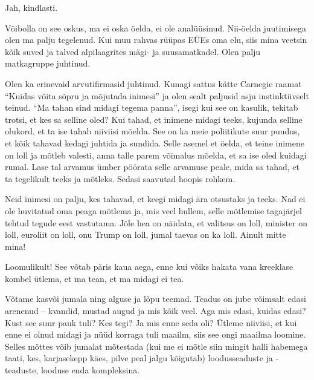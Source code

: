 
Jah, kindlasti.


Võibolla on see oskus, ma ei oska öelda, ei ole analüüsinud. 
Nii-öelda juutimisega olen ma palju tegelenud. Kui muu rahvas rüüpas EÜEs 
oma elu, siis mina veetsin kõik suved ja talved alpilaagrites mägi- ja suusamatkadel. Olen palju matkagruppe juhtinud.

Olen ka erinevaid arvutifirmasid 
juhtinud. Kunagi sattus kätte Carnegie raamat \enquote{Kuidas võita 
sõpru ja mõjutada inimesi} ja olen sealt paljusid asju 
instinktiivselt teinud. \enquote{Ma tahan sind midagi 
tegema panna}, isegi kui see on kasulik, tekitab trotsi, et kes 
sa selline oled? Kui tahad, et inimene midagi teeks, kujunda selline 
olukord, et ta ise tahab niiviisi mõelda. See on ka meie poliitikute 
suur puudus, et kõik tahavad kedagi juhtida ja sundida. Selle asemel et öelda, et teine inimene on 
loll ja mõtleb valesti, anna talle parem võimalus mõelda, et sa ise oled kuidagi rumal. 
Lase tal arvamus ümber pöörata selle arvamuse peale, mida sa tahad, et ta 
tegelikult teeks ja mõtleks. Sedasi saavutad hoopis rohkem. 

Neid inimesi on palju, kes tahavad, et keegi midagi ära otsustaks ja 
teeks. Nad ei ole huvitatud oma peaga 
mõtlema ja, mis veel hullem, selle mõtlemise tagajärjel tehtud tegude eest 
vastutama. Jõle hea on näidata, et valitsus on loll, minister on loll, euroliit 
on loll, onu Trump on loll, jumal taevas on ka loll. Ainult mitte mina!


Loomulikult! See võtab päris kaua aega, enne kui võiks hakata vana kreeklase 
kombel ütlema, et ma tean, et ma midagi ei tea. 

Võtame kasvõi jumala ning alguse ja lõpu teemad. Teadus on jube 
võimsalt edasi arenenud -- kvandid, mustad augud ja mis kõik veel. Aga mis edasi, kuidas 
edasi? Kust see suur pauk tuli? Kes tegi? Ja mis enne seda oli? 
Ütleme niiviisi, et kui enne ei olnud midagi ja nüüd korraga tuli maailm, siis 
see ongi maailma loomine. Selles mõttes võib jumalat mõtestada (kui me ei mõtle
siin mingit halli habemega taati, kes, karjasekepp käes, pilve peal 
jalgu kõigutab) loodusseaduste ja -teaduste, looduse enda 
kompleksina. 


